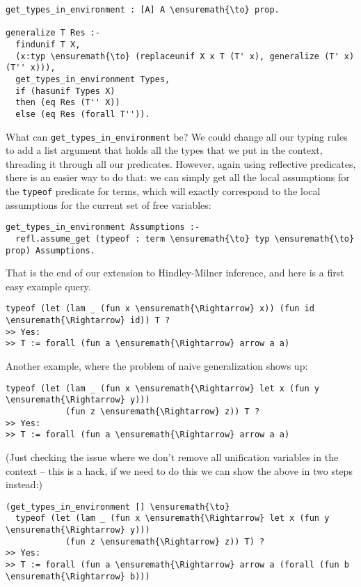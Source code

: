 \begin{verbatim}
get_types_in_environment : [A] A \ensuremath{\to} prop.

generalize T Res :-
  findunif T X,
  (x:typ \ensuremath{\to} (replaceunif X x T (T' x), generalize (T' x) (T'' x))),
  get_types_in_environment Types,
  if (hasunif Types X)
  then (eq Res (T'' X))
  else (eq Res (forall T'')).
\end{verbatim}

What can \texttt{get\_types\_in\_environment} be? We could change all
our typing rules to add a list argument that holds all the types that we
put in the context, threading it through all our predicates. However,
again using reflective predicates, there is an easier way to do that: we
can simply get all the local assumptions for the \texttt{typeof}
predicate for terms, which will exactly correspond to the local
assumptions for the current set of free variables:

\begin{verbatim}
get_types_in_environment Assumptions :-
  refl.assume_get (typeof : term \ensuremath{\to} typ \ensuremath{\to} prop) Assumptions.
\end{verbatim}

That is the end of our extension to Hindley-Milner inference, and here
is a first easy example query.

\begin{verbatim}
typeof (let (lam _ (fun x \ensuremath{\Rightarrow} x)) (fun id \ensuremath{\Rightarrow} id)) T ?
>> Yes:
>> T := forall (fun a \ensuremath{\Rightarrow} arrow a a)
\end{verbatim}

Another example, where the problem of naive generalization shows up:

\begin{verbatim}
typeof (let (lam _ (fun x \ensuremath{\Rightarrow} let x (fun y \ensuremath{\Rightarrow} y)))
            (fun z \ensuremath{\Rightarrow} z)) T ?
>> Yes:
>> T := forall (fun a \ensuremath{\Rightarrow} arrow a a)
\end{verbatim}

(Just checking the issue where we don't remove all unification variables
in the context -- this is a hack, if we need to do this we can show the
above in two steps instead:)

\begin{verbatim}
(get_types_in_environment [] \ensuremath{\to}
  typeof (let (lam _ (fun x \ensuremath{\Rightarrow} let x (fun y \ensuremath{\Rightarrow} y)))
            (fun z \ensuremath{\Rightarrow} z)) T) ?
>> Yes:
>> T := forall (fun a \ensuremath{\Rightarrow} arrow a (forall (fun b \ensuremath{\Rightarrow} b)))
\end{verbatim}
